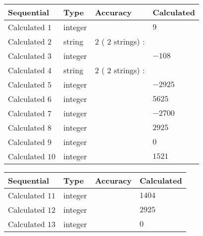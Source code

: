 \documentclass[12pt]{article}
\begin{document}
  
\noindent\begin{tabular}{|l|l|l|l|}
\hline
 Sequential & Type & Accuracy & Calculated \\ 
\hline
 
 
  Calculated $           1$ & integer &  & 
  $ 9 $ 
 \\  \hline  
 
 
  Calculated $           2$ & string & $           2 $ ( $          2 $ strings)
 : 
 & 
 \\  \hline  
 
 
  Calculated $           3$ & integer &  & 
  $ -108 $ 
 \\  \hline  
 
 
  Calculated $           4$ & string & $           2 $ ( $          2 $ strings)
 : 
 & 
 \\  \hline  
 
 
  Calculated $           5$ & integer &  & 
  $ -2925 $ 
 \\  \hline  
 
 
  Calculated $           6$ & integer &  & 
  $ 5625 $ 
 \\  \hline  
 
 
  Calculated $           7$ & integer &  & 
  $ -2700 $ 
 \\  \hline  
 
 
  Calculated $           8$ & integer &  & 
  $ 2925 $ 
 \\  \hline  
 
 
  Calculated $           9$ & integer &  & 
  $ 0 $ 
 \\  \hline  
 
 
  Calculated $          10$ & integer &  & 
  $ 1521 $ 
 \\  \hline  
 \end{tabular}
   
   
  
  
\noindent\begin{tabular}{|l|l|l|l|}
\hline
 Sequential & Type & Accuracy & Calculated \\ 
\hline
 
 
  Calculated $          11$ & integer &  & 
  $ 1404 $ 
 \\  \hline  
 
 
  Calculated $          12$ & integer &  & 
  $ 2925 $ 
 \\  \hline  
 
 
  Calculated $          13$ & integer &  & 
  $ 0 $ 
 \\  \hline  
 \end{tabular}
   
\end{document}
